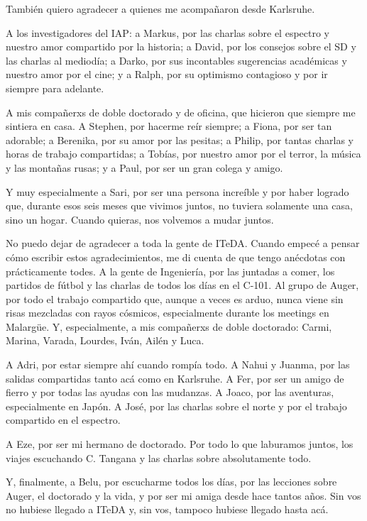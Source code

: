 También quiero agradecer a quienes me acompañaron desde Karlsruhe.

A los investigadores del IAP: a Markus, por las charlas sobre el espectro y nuestro amor compartido por la historia; a David, por los consejos sobre el SD y las charlas al mediodía; a Darko, por sus incontables sugerencias académicas y nuestro amor por el cine; y a Ralph, por su optimismo contagioso y por ir siempre para adelante.

A mis compañerxs de doble doctorado y de oficina, que hicieron que siempre me sintiera en casa. A Stephen, por hacerme reír siempre; a Fiona, por ser tan adorable; a Berenika, por su amor por las pesitas; a Philip, por tantas charlas y horas de trabajo compartidas; a Tobías, por nuestro amor por el terror, la música y las montañas rusas; y a Paul, por ser un gran colega y amigo.

Y muy especialmente a Sari, por ser una persona increíble y por haber logrado que, durante esos seis meses que vivimos juntos, no tuviera solamente una casa, sino un hogar. Cuando quieras, nos volvemos a mudar juntos.

No puedo dejar de agradecer a toda la gente de ITeDA. Cuando empecé a pensar cómo escribir estos agradecimientos, me di cuenta de que tengo anécdotas con prácticamente todes.
A la gente de Ingeniería, por las juntadas a comer, los partidos de fútbol y las charlas de todos los días en el C-101. Al grupo de Auger, por todo el trabajo compartido que, aunque a veces es arduo, nunca viene sin risas mezcladas con rayos cósmicos, especialmente durante los meetings en Malargüe.
Y, especialmente, a mis compañerxs de doble doctorado: Carmi, Marina, Varada, Lourdes, Iván, Ailén y Luca.

A Adri, por estar siempre ahí cuando rompía todo. A Nahui y Juanma, por las salidas compartidas tanto acá como en Karlsruhe. A Fer, por ser un amigo de fierro y por todas las ayudas con las mudanzas. A Joaco, por las aventuras, especialmente en Japón. A José, por las charlas sobre el norte y por el trabajo compartido en el espectro.

A Eze, por ser mi hermano de doctorado. Por todo lo que laburamos juntos, los viajes escuchando C. Tangana y las charlas sobre absolutamente todo.

Y, finalmente, a Belu, por escucharme todos los días, por las lecciones sobre Auger, el doctorado y la vida, y por ser mi amiga desde hace tantos años. Sin vos no hubiese llegado a ITeDA y, sin vos, tampoco hubiese llegado hasta acá.

